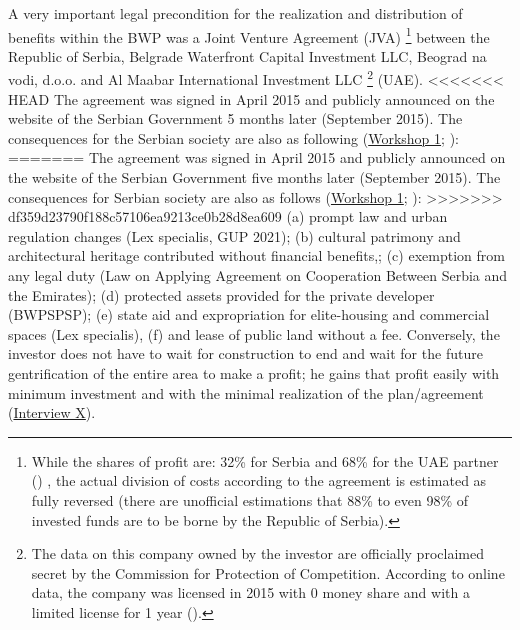 \documentclass[11pt]{report}
\begin{document}
A very important legal precondition for the realization and distribution of benefits within the BWP was a Joint Venture Agreement (JVA)
\footnote{While the shares of profit are: 32\% for Serbia and 68\% for the UAE partner (\cite{JVA BWP, 2015}) %
, the actual division of costs according to the agreement is estimated as fully reversed (there are unofficial estimations that 88\% to even 98\% of invested funds are to be borne by the Republic of Serbia).}
between the Republic of Serbia, Belgrade Waterfront Capital Investment LLC, Beograd na vodi, d.o.o. and Al Maabar International Investment LLC
\footnote{The data on this company owned by the investor are officially proclaimed secret by the Commission
for Protection of Competition. According to online data, the company was licensed in 2015 with 0 money share and with a limited license for 1 year  (\href{Analiza}{\citealt{inicijativa_ne_davimo_beograd_analiza_2016}}).} 
(UAE).
<<<<<<< HEAD
The agreement was signed in April 2015 and publicly announced on the website of the Serbian Government 5 months later (September 2015).
The consequences for the Serbian society are also as following 
(\href{Expert Workshop}{Workshop 1}; \href{Zekovic}{\citealt{zekovic_megaprojects_2016}}):
=======
The agreement was signed in April 2015 and publicly announced on the website of the Serbian Government five months later (September 2015). The consequences for Serbian society are also as follows 
(\href{Expert Workshop}{Workshop 1}; \cite{zekovic_megaprojects_2016}):
>>>>>>> df359d23790f188c57106ea9213ce0b28d8ea609
(a) prompt law and urban regulation changes (Lex specialis, GUP 2021);
(b) cultural patrimony and architectural heritage contributed without financial benefits,;
(c) exemption from any legal duty (Law on Applying Agreement on Cooperation Between Serbia and the Emirates);
(d) protected assets provided for the private developer (BWPSPSP);
(e) state aid and expropriation for elite-housing and commercial spaces (Lex specialis),
(f) and lease of public land without a fee.
Conversely, the investor does not have to wait for construction to end and wait for the future gentrification of the entire area to make a profit; he gains that profit easily with minimum investment and with the minimal realization of the plan/agreement 
(\href{InterviewX}{Interview X}).
\\
\end{document}
